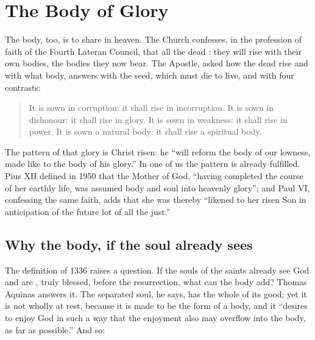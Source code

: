 \section{The Body of Glory}

The body, too, is to share in heaven. The Church confesses, in the profession of faith of the Fourth Lateran Council, that all the dead : they will rise with their own bodies, the bodies they now bear. The Apostle, asked how the dead rise and with what body, answers with the seed, which must die to live, and with four contrasts:

\begin{quote}
It is sown in corruption: it shall rise in incorruption. It is sown in dishonour: it shall rise in glory. It is sown in weakness: it shall rise in power. It is sown a natural body: it shall rise a spiritual body.
\end{quote}

The pattern of that glory is Christ risen: he ``will reform the body of our lowness, made like to the body of his glory.'' In one of us the pattern is already fulfilled. Pius XII defined in 1950 that the Mother of God, ``having completed the course of her earthly life, was assumed body and soul into heavenly glory''; and Paul VI, confessing the same faith, adds that she was thereby ``likened to her risen Son in anticipation of the future lot of all the just.''

\subsection{Why the body, if the soul already sees}

The definition of 1336 raises a question. If the souls of the saints already see God and are , truly blessed, before the resurrection, what can the body add? Thomas Aquinas answers it. The separated soul, he says, has the whole of its good; yet it is not wholly at rest, because it is made to be the form of a body, and it ``desires to enjoy God in such a way that the enjoyment also may overflow into the body, as far as possible.'' And so:

